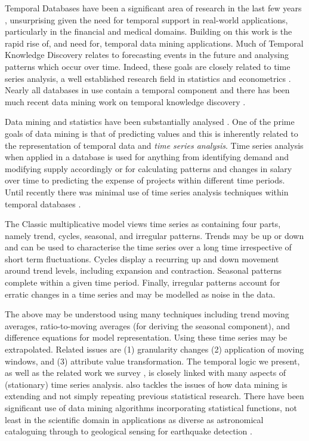 \medskip

Temporal
Databases have been a significant area of research in the last few
years \cite{tcg93,ct95}, unsurprising given the need for temporal
support in real-world applications, particularly in the financial and
medical domains. Building on this work is the rapid rise of, and need
for, temporal data mining applications.  
Much of Temporal Knowledge Discovery relates to forecasting events in the
future and analysing 
patterns which occur over time. Indeed, these goals are closely
related to time series analysis, a well established research field in
statistics and econometrics \cite{end95,naze88}. Nearly all databases
in use contain a 
temporal component and there has been much recent data  mining work on
temporal knowledge discovery \cite{alss95,pt96,bc96,bt98}. 

\medskip

Data mining and statistics have been substantially analysed
\cite{fhs96,gmp97}. One of the prime goals of data mining
is that of predicting values and this is inherently related to the
representation of temporal data and {\em time series analysis}. Time
series analysis when applied in a 
 database is used for anything from identifying demand and modifying
supply accordingly or for calculating patterns and changes in salary over time
to predicting the expense of projects within different time
periods. Until recently there was minimal use of time series analysis
techniques within temporal databases \cite{smd95}.

The Classic multiplicative model views time series as containing four
parts, namely trend, cycles, seasonal, and irregular patterns.
Trends may be up or down and can be used to characterise the time
series over a long time irrespective of short term fluctuations.
Cycles display a recurring up and down movement around trend levels,
including expansion and contraction. Seasonal patterns complete within
a given time period. Finally, irregular patterns account for erratic
changes in a time series and may be modelled as noise in the data.
\smallskip

The above may be understood using many techniques including trend
moving averages, ratio-to-moving averages (for deriving 
the seasonal component), and difference equations for model
representation. Using these time series may be extrapolated.
Related issues are (1) granularity changes (2) application of moving
windows, and (3) attribute value transformation. The temporal logic we
present, as well as the related work we survey
\cite{frm94,lai93,alss95,dgm97,dlm98}, is closely linked with many
aspects of (stationary) time series analysis. \cite{gmp97} also
tackles the issues of how data mining is extending and not simply
repeating previous statistical research. There have been significant
use of data mining algorithms incorporating statistical
functions, not least in the scientific domain in applications as
diverse as astronomical cataloguing through to geological sensing for
earthquake detection \cite{fhs96}.

